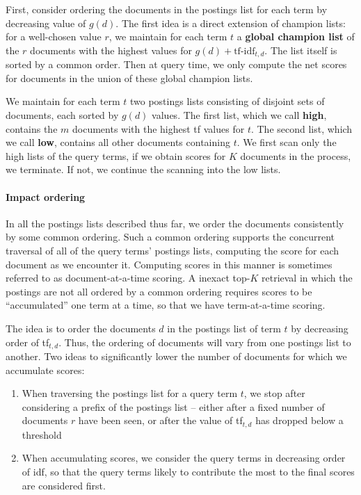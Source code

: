\documentclass[letterpaper,11pt]{article}
\begin{document}
First, consider ordering the documents in the postings list for each term by decreasing value of $g(d)$. The first idea is a direct extension of champion lists: for a well-chosen value $r$, we maintain for each term $t$ a \textbf{global champion list} of the $r$ documents with the highest values for $g(d) + \textrm{tf-idf}_{t,d}$. The list itself is sorted by a common order. Then at query time, we only compute the net scores for documents in the union of these global champion lists.

We maintain for each term $t$ two postings lists consisting of disjoint sets of documents, each sorted by $g(d)$ values. The first list, which we call \textbf{high}, contains the $m$ documents with the highest tf values for $t$. The second list, which we call \textbf{low}, contains all other documents containing $t$. We first scan only the high lists of the query terms, if we obtain scores for $K$ documents in the process, we terminate. If not, we continue the scanning into the low lists.

\paragraph{Impact ordering}
In all the postings lists described thus far, we order the documents consistently by some common ordering. Such a common ordering supports the concurrent traversal of all of the query terms’ postings lists, computing the score for each document as we encounter it. Computing scores in this manner is sometimes referred to as document-at-a-time scoring. A inexact top-$K$ retrieval in which the postings are not all ordered by a common ordering requires scores to be “accumulated” one term at a time, so that we have term-at-a-time scoring.

The idea is to order the documents $d$ in the postings list of term $t$ by decreasing order of tf$_{t,d}$. Thus, the ordering of documents will vary from one postings list to another. Two ideas to significantly lower the number of documents for which we accumulate scores:
\begin{enumerate}
    \item When traversing the postings list for a query term $t$, we stop after considering a prefix of the postings list – either after a fixed number of documents $r$ have been seen, or after the value of tf$_{t,d}$ has dropped below a threshold
    \item When accumulating scores, we consider the query terms in decreasing order of idf, so that the query terms likely to contribute the most to the final scores are considered first.
\end{enumerate}
\end{document}
